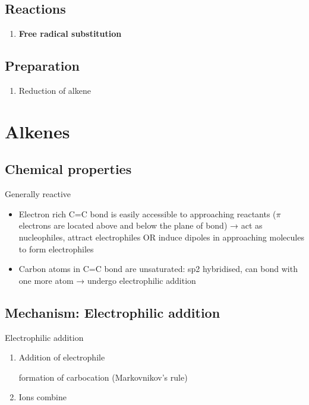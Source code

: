 \documentclass[12pt,a4 paper]{article}
\begin{document}
\subsection{Reactions}
\begin{enumerate}
\item \textbf{Free radical substitution}
\end{enumerate}

\subsection{Preparation}
\begin{enumerate}
\item Reduction of alkene
\end{enumerate}
\pagebreak

\section{Alkenes}
\subsection*{Chemical properties}
Generally reactive
\begin{itemize}
\item Electron rich C=C bond is easily accessible to approaching reactants ($\pi$ electrons are located above and below the plane of bond) → act as nucleophiles, attract electrophiles OR induce dipoles in approaching molecules to form electrophiles

\item Carbon atoms in C=C bond are unsaturated: sp2 hybridised, can bond with one more atom → undergo electrophilic addition
\end{itemize}

\subsection{Mechanism: Electrophilic addition}
\begin{mechanism}{Electrophilic addition}{}
\begin{enumerate}[leftmargin=0.65in,label=\textbf{Step \arabic*:}]
\item Addition of electrophile

formation of carbocation (Markovnikov’s rule)

\item Ions combine
\end{enumerate}
\end{mechanism}
\end{document}
